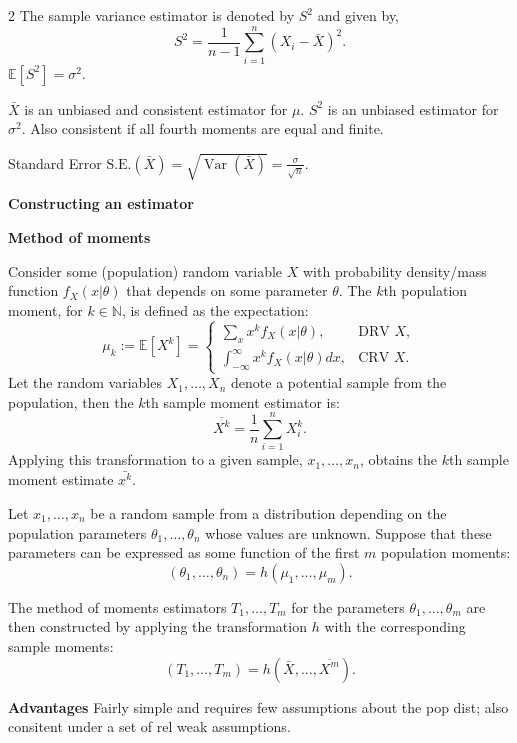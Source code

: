 \documentclass[10pt]{extarticle}
\theoremstyle{definition}
\theoremstyle{remark}
\newcommand{\N}{\mathbb{N}}
\newcommand{\E}{\mathbb{E}}
\DeclareMathOperator{\Var}{Var}
\begin{document}
\begin{multicols}{2}
    The sample variance estimator is denoted by $S^2$ and given by, \[
        S^2 = \frac{1}{n-1} \sum_{i=1}^n(X_i-\bar{X})^2.
    \] $\E[S^2] = \sigma^2.$

    $\bar{X}$ is an unbiased and consistent estimator for $\mu$. 
    $S^2$ is an unbiased estimator for $\sigma^2$. Also consistent if all fourth
    moments are equal and finite. 

    Standard Error $\text{S.E.}(\bar{X}) = \sqrt{\Var(\bar{X})} = \frac{\sigma}{\sqrt{n}}.$

    \noindent
    \textbf{Constructing an estimator}

    \textbf{Method of moments}

    Consider some (population) random variable $X$ with probability density/mass
    function $f_X(x|\theta)$ that depends on some parameter $\theta$. The $k$th
    population
    moment, for $k \in \N$, is defined as the expectation:
    \begin{equation*}
        \mu_k := \E [X^k] = \begin{cases}
            \sum_x x^k f_X(x | \theta), & \text{DRV $X$}, \\
            \int_{-\infty}^\infty x^k f_X(x | \theta) dx, & \text{CRV $X$.}
        \end{cases}
    \end{equation*}
    Let the random variables $X_1 , \ldots , X_n$ denote a potential sample from the
    population, then the $k$th sample moment estimator is: \[
        \overline{X^k} = \frac{1}{n} \sum^n_{i=1} X^k_i.
    \]
    Applying this transformation to a given sample, $x_1 , \ldots , x_n$, obtains the
    $k$th sample moment estimate $\bar{x^k}$.

    Let $x_1 , \ldots , x_n$ be a random sample from a distribution depending on
    the population parameters $\theta_1 , \ldots , \theta_n$ whose values are
    unknown. Suppose
    that these parameters can be expressed as some function of the first $m$ 
    population moments: \[ 
        (\theta_1 , \ldots , \theta_n) = h(\mu_1 , \ldots , \mu_m).
    \]

    The method of moments estimators $T_1, \ldots, T_m$ for the parameters 
    $\theta_1, \ldots, \theta_m$ are then constructed by applying the
    transformation $h$ with the corresponding sample moments: \[
        (T_1, \ldots, T_m) = h(\bar{X}, \ldots, \overline{X^m}). 
    \]

    \textbf{Advantages} Fairly simple and requires few assumptions about the
    pop dist; also consitent under a set of rel weak assumptions. 


\end{multicols}
\end{document}
